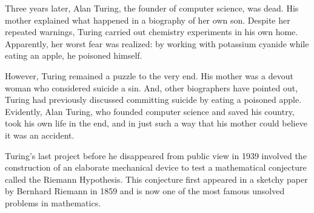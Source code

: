 Three years later, Alan Turing, the founder of computer science,
was dead.  His mother explained what happened in a biography of her
own son.  Despite her repeated warnings, Turing carried out chemistry
experiments in his own home.  Apparently, her worst fear was realized:
by working with potassium cyanide while eating an apple, he poisoned
himself.

However, Turing remained a puzzle to the very end.  His mother was a
devout woman who considered suicide a sin.  And, other biographers
have pointed out, Turing had previously discussed committing suicide
by eating a poisoned apple.  Evidently, Alan Turing, who founded
computer science and saved his country, took his own life in the end,
and in just such a way that his mother could believe it was an
accident.

Turing's last project before he disappeared from public view in 1939
involved the construction of an elaborate mechanical device to test a
mathematical conjecture called the Riemann Hypothesis.  This
conjecture first appeared in a sketchy paper by Bernhard Riemann in
1859 and is now one of the most famous unsolved problems in
mathematics.


